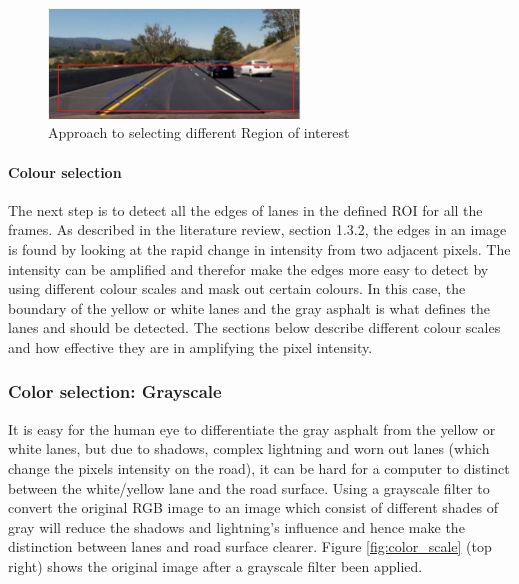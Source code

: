 \begin{figure}[H]
    \centering
    \includegraphics[width = 0.6\textwidth]{Figures/ROI_new.pdf}
    \caption{Approach to selecting different Region of interest}
    \label{fig:my_ROI}
\end{figure}

\paragraph{Colour selection}

The next step is to detect all the edges of lanes in the defined ROI for all the frames. As described in the literature review, section 1.3.2, the edges in an image is found by looking at the rapid change in intensity from two adjacent pixels. The intensity can be amplified and therefor make the edges more easy to detect by using different colour scales and mask out certain colours. In this case, the boundary of the yellow or white lanes and the gray asphalt is what defines the lanes and should be detected. The sections below describe different colour scales and how effective they are in amplifying the pixel intensity.

\subsubsection*{Color selection: Grayscale}
It is easy for the human eye to differentiate the gray asphalt from the yellow or white lanes, but due to shadows, complex lightning and worn out lanes (which change the pixels intensity on the road), it can be hard for a computer to distinct between the white/yellow lane and the road surface. Using a grayscale filter to convert the original RGB image to an image which consist of different shades of gray will reduce the shadows and lightning's influence and hence make the distinction between lanes and road surface clearer. Figure \ref{fig:color_scale} (top right) shows the original image after a grayscale filter been applied.

